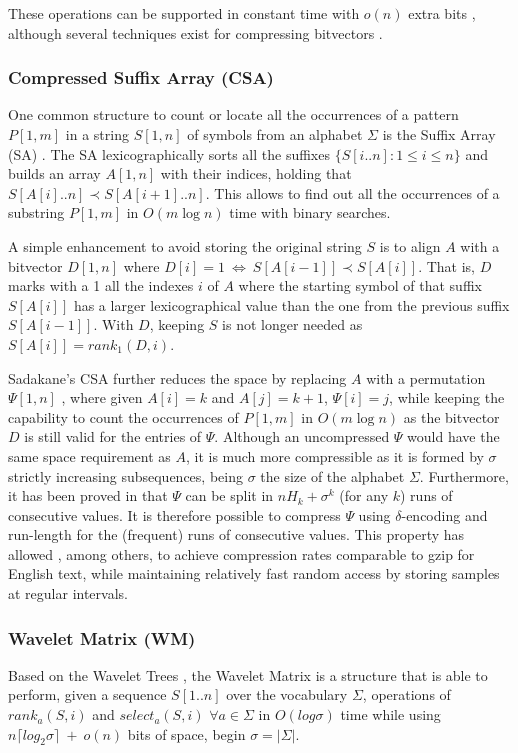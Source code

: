 \documentclass[runningheads]{llncs}
\begin{document}
These operations can be supported in constant time with $o(n)$ extra bits \cite{Jac89,Mun96}, although several techniques exist for compressing bitvectors \cite{Raman:2002:SID:545381.545411,okanohara2007practical,Golynski2007}.

\subsubsection{Compressed Suffix Array (CSA)}
\label{sec:csa}
One common structure to count or locate all the occurrences of a pattern $P[1,m]$ in a string $S[1,n]$ of symbols from an alphabet $\Sigma$ is the Suffix Array (SA) \cite{MM93}. The SA lexicographically sorts all the suffixes $\{S[i..n] : 1 \leq i \leq n\}$ and builds an array $A[1,n]$ with their indices, holding that $S[A[i]..n] \prec S[A[i+1]..n]$. This allows to find out all the occurrences of a substring $P[1,m]$ in $O(m \log n)$ time with binary searches.

A simple enhancement to avoid storing the original string $S$ is to align $A$ with a bitvector $D[1,n]$ where $D[i]=1~\Leftrightarrow~S[A[i-1]] \prec S[A[i]]$. That is, $D$ marks with a 1 all the indexes $i$ of $A$ where the starting symbol of that suffix $S[A[i]]$ has a larger lexicographical value than the one from the previous suffix $S[A[i-1]]$. With $D$, keeping $S$ is not longer needed as $S[A[i]] = rank_1(D,i)$.

Sadakane's CSA \cite{Sad03} further reduces the space by replacing $A$ with a permutation $\Psi[1,n]$ \cite{GV00}, where given $A[i]=k$ and $A[j]=k+1$, $\Psi[i]=j$, while keeping the capability to count the occurrences of $P[1,m]$ in $O(m \log n)$ as the bitvector $D$ is still valid for the entries of $\Psi$. Although an uncompressed $\Psi$ would have the same space requirement as $A$, it is much more compressible as it is formed by $\sigma$ strictly increasing subsequences, being $\sigma$ the size of the alphabet $\Sigma$. Furthermore, it has been proved in \cite{NM07} that $\Psi$ can be split in $nH_k+\sigma^k$ (for any $k$) runs of consecutive values. It is therefore possible to compress $\Psi$ using $\delta$-encoding and run-length for the (frequent) runs of consecutive values. This property has allowed \cite{FBNCPR12}, among others, to achieve compression rates comparable to gzip for English text, while maintaining relatively fast random access by storing samples at regular intervals.

\subsubsection{Wavelet Matrix (WM)}
\label{sec:wm}
Based on the Wavelet Trees \cite{WT03}, the Wavelet Matrix \cite{CNO15} is a structure that is able to perform, given a sequence $S[1..n]$ over the vocabulary $\Sigma$, operations of $rank_a(S,i)$ and $select_a(S,i)$ $\forall a \in \Sigma$ in $O(log\sigma)$ time while using $n\lceil log_2\sigma\rceil~+~o(n)$ bits of space, begin $\sigma = |\Sigma|$.
\end{document}
